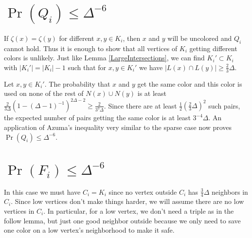 \documentclass[12pt]{amsart}
\theoremstyle{plain}
\theoremstyle{definition}
\theoremstyle{remark}
\newcommand{\card}[1]{\left|#1\right|}
\begin{document}
\section{$\Pr(Q_i) \leq \Delta^{-6}$}
If $\zeta(x) = \zeta(y)$ for different $x,y \in K_i$, then $x$ and $y$ will be
uncolored and $Q_i$ cannot hold.  Thus it is enough to show that all vertices of
$K_i$ getting different colors is unlikely.  Just like Lemma
\ref{LargeIntersections}, we can find $K_i' \subset K_i$ with $\card{K_i'} =
\card{K_i} - 1$ such that for $x,y \in K_i'$ we have $\card{L(x) \cap L(y)}
\geq \frac23 \Delta$.  

Let $x, y \in K_i'$.  The probability that $x$ and $y$ get the same color and
this color is used on none of the rest of $N(x) \cup N(y)$ is at least
$\frac{2}{3\Delta}(1 - (\Delta-1)^{-1})^{2\Delta - 2} \geq \frac{2}{3^3\Delta}$.
Since there are at least $\frac12 (\frac23 \Delta)^2$ such pairs, the expected
number of pairs getting the same color is at least $3^{-4}\Delta$.  An
application of Azuma's inequality very similar to the sparse case now proves
$\Pr(Q_i) \leq \Delta^{-6}$.

\section{$\Pr(F_i) \leq \Delta^{-6}$}
In this case we must have $C_i = K_i$ since no vertex outside $C_i$ has
$\frac34 \Delta$ neighbors in $C_i$.  Since low vertices don't make things
harder, we will assume there are no low vertices in $C_i$.  In particular, for a
low vertex, we don't need a triple as in the follow lemma, but just one good neighbor outside because we only need to save one color on a low
vertex's neighborhood to make it safe.
\end{document}
